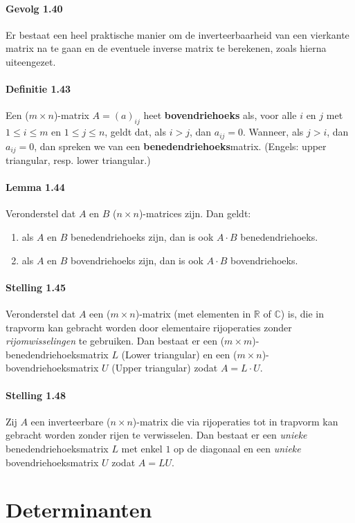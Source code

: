 \documentclass[11pt,oneside,a4paper]{article}
\begin{document}
	\paragraph{Gevolg 1.40}
		Er bestaat een heel praktische manier om de inverteerbaarheid van een vierkante matrix na te gaan en de eventuele inverse matrix te berekenen, zoals hierna uiteengezet.
	\paragraph{Definitie 1.43}
		Een ($m \times n$)-matrix $A = (a)_{ij}$ heet \textbf{bovendriehoeks} als, voor alle $i$ en $j$ met $1 \le i \le m$ en $1 \le j \le n$, geldt dat, als $i > j$, dan $a_{ij} = 0$. Wanneer, als $j > i$, dan $a_{ij} = 0$, dan spreken we van een \textbf{benedendriehoeks}matrix. (Engels: upper triangular, resp. lower triangular.)
	\paragraph{Lemma 1.44}
		Veronderstel dat $A$ en $B$ ($n \times n$)-matrices zijn. Dan geldt:
		\begin{enumerate}
			\item als $A$ en $B$ benedendriehoeks zijn, dan is ook $A \cdot B$ benedendriehoeks.
			\item als $A$ en $B$ bovendriehoeks zijn, dan is ook $A \cdot B$ bovendriehoeks.
		\end{enumerate}
	\paragraph{Stelling 1.45}
		Veronderstel dat $A$ een ($m \times n$)-matrix (met elementen in $\mathbb{R}$ of $\mathbb{C}$) is, die in trapvorm kan gebracht worden door elementaire rijoperaties zonder \textit{rijomwisselingen} te gebruiken. Dan bestaat er een ($m \times m$)-benedendriehoeksmatrix $L$ (Lower triangular) en een ($m \times n$)-bovendriehoeksmatrix $U$ (Upper triangular) zodat $A = L \cdot U$.
	\paragraph{Stelling 1.48}
		Zij $A$ een inverteerbare ($n \times n$)-matrix die via rijoperaties tot in trapvorm kan gebracht worden zonder rijen te verwisselen. Dan bestaat er een \textit{unieke} benedendriehoeksmatrix $L$ met enkel $1$ op de diagonaal en een \textit{unieke} bovendriehoeksmatrix $U$ zodat $A = LU$.
		
	\section{Determinanten}
	
\end{document}
